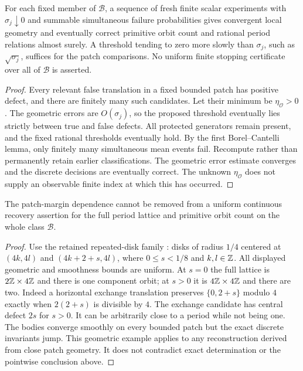 \begin{corollary}\label{cor:pointwise}
For each fixed member of $\mathcal B$, a sequence of fresh finite
scalar experiments with $\sigma_j\downarrow0$ and summable simultaneous
failure probabilities gives convergent local geometry and eventually
correct primitive orbit count and rational period relations almost
surely. A threshold tending to zero more slowly than $\sigma_j$, such
as $\sqrt{\sigma_j}$, suffices for the patch comparisons. No uniform
finite stopping certificate over all of $\mathcal B$ is asserted.
\end{corollary}
\begin{proof}
Every relevant false translation in a fixed bounded patch has positive
defect, and there are finitely many such candidates. Let their minimum
be $\eta_{\mathcal O}>0$. The geometric errors are $O(\sigma_j)$,
so the proposed threshold eventually lies strictly between true and
false defects. All protected generators remain present, and the fixed
rational thresholds eventually hold. By the first Borel--Cantelli
lemma, only finitely many simultaneous mean events fail. Recompute
rather than permanently retain earlier classifications. The geometric
error estimate converges and the discrete decisions are eventually
correct. The unknown $\eta_{\mathcal O}$ does not supply an observable
finite index at which this has occurred.
\end{proof}

\begin{proposition}
\label{prop:jump}
The patch-margin dependence cannot be removed from a uniform continuous
recovery assertion for the full period lattice and primitive orbit count
on the whole class $\mathcal B$.
\end{proposition}
\begin{proof}
Use the retained repeated-disk family \cite{Supplement}: disks of
radius $1/4$ centered at $(4k,4l)$ and $(4k+2+s,4l)$, where
$0\le s<1/8$ and $k,l\in\mathbb Z$. All displayed geometric and smoothness
bounds are uniform. At $s=0$ the full lattice is $2\mathbb Z\times4\mathbb Z$
and there is one component orbit; at $s>0$ it is $4\mathbb Z\times4\mathbb Z$
and there are two. Indeed a horizontal exchange translation preserves
$\{0,2+s\}$ modulo $4$ exactly when $2(2+s)$ is divisible by $4$.
The exchange candidate has central defect $2s$ for $s>0$. It can be
arbitrarily close to a period while not being one. The bodies converge
smoothly on every bounded patch but the exact discrete invariants jump.
This geometric example applies to any reconstruction derived from close
patch geometry. It does not contradict exact determination or the
pointwise conclusion above.
\end{proof}
